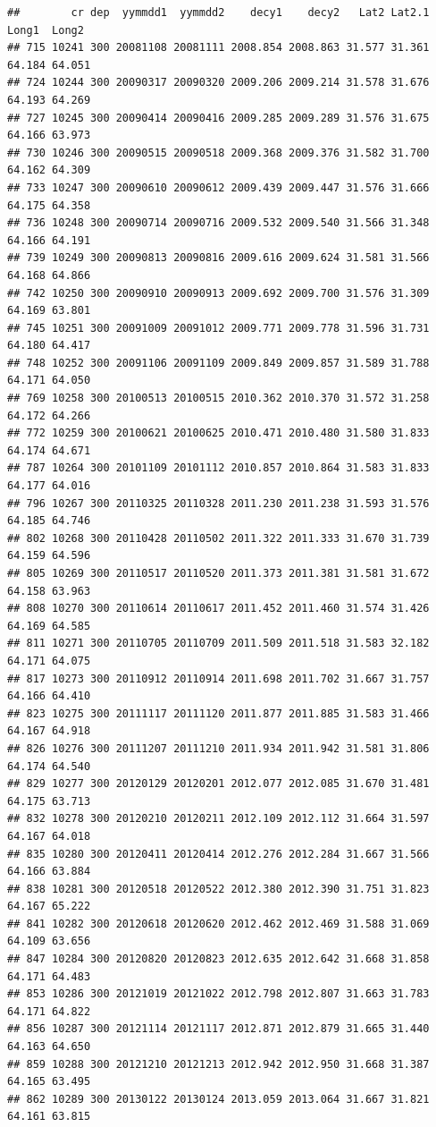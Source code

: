 \documentclass[]{article}
\begin{document}
\begin{verbatim}
##        cr dep  yymmdd1  yymmdd2    decy1    decy2   Lat2 Lat2.1  Long1  Long2
## 715 10241 300 20081108 20081111 2008.854 2008.863 31.577 31.361 64.184 64.051
## 724 10244 300 20090317 20090320 2009.206 2009.214 31.578 31.676 64.193 64.269
## 727 10245 300 20090414 20090416 2009.285 2009.289 31.576 31.675 64.166 63.973
## 730 10246 300 20090515 20090518 2009.368 2009.376 31.582 31.700 64.162 64.309
## 733 10247 300 20090610 20090612 2009.439 2009.447 31.576 31.666 64.175 64.358
## 736 10248 300 20090714 20090716 2009.532 2009.540 31.566 31.348 64.166 64.191
## 739 10249 300 20090813 20090816 2009.616 2009.624 31.581 31.566 64.168 64.866
## 742 10250 300 20090910 20090913 2009.692 2009.700 31.576 31.309 64.169 63.801
## 745 10251 300 20091009 20091012 2009.771 2009.778 31.596 31.731 64.180 64.417
## 748 10252 300 20091106 20091109 2009.849 2009.857 31.589 31.788 64.171 64.050
## 769 10258 300 20100513 20100515 2010.362 2010.370 31.572 31.258 64.172 64.266
## 772 10259 300 20100621 20100625 2010.471 2010.480 31.580 31.833 64.174 64.671
## 787 10264 300 20101109 20101112 2010.857 2010.864 31.583 31.833 64.177 64.016
## 796 10267 300 20110325 20110328 2011.230 2011.238 31.593 31.576 64.185 64.746
## 802 10268 300 20110428 20110502 2011.322 2011.333 31.670 31.739 64.159 64.596
## 805 10269 300 20110517 20110520 2011.373 2011.381 31.581 31.672 64.158 63.963
## 808 10270 300 20110614 20110617 2011.452 2011.460 31.574 31.426 64.169 64.585
## 811 10271 300 20110705 20110709 2011.509 2011.518 31.583 32.182 64.171 64.075
## 817 10273 300 20110912 20110914 2011.698 2011.702 31.667 31.757 64.166 64.410
## 823 10275 300 20111117 20111120 2011.877 2011.885 31.583 31.466 64.167 64.918
## 826 10276 300 20111207 20111210 2011.934 2011.942 31.581 31.806 64.174 64.540
## 829 10277 300 20120129 20120201 2012.077 2012.085 31.670 31.481 64.175 63.713
## 832 10278 300 20120210 20120211 2012.109 2012.112 31.664 31.597 64.167 64.018
## 835 10280 300 20120411 20120414 2012.276 2012.284 31.667 31.566 64.166 63.884
## 838 10281 300 20120518 20120522 2012.380 2012.390 31.751 31.823 64.167 65.222
## 841 10282 300 20120618 20120620 2012.462 2012.469 31.588 31.069 64.109 63.656
## 847 10284 300 20120820 20120823 2012.635 2012.642 31.668 31.858 64.171 64.483
## 853 10286 300 20121019 20121022 2012.798 2012.807 31.663 31.783 64.171 64.822
## 856 10287 300 20121114 20121117 2012.871 2012.879 31.665 31.440 64.163 64.650
## 859 10288 300 20121210 20121213 2012.942 2012.950 31.668 31.387 64.165 63.495
## 862 10289 300 20130122 20130124 2013.059 2013.064 31.667 31.821 64.161 63.815

\end{verbatim}
\end{document}
